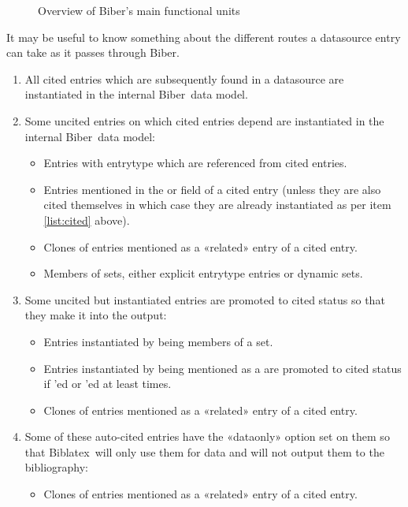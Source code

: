 \documentclass{ltxdockit}
\newcommand*{\biber}{Biber\xspace}
\newcommand*{\biblatex}{Biblatex\xspace}
\begin{document}
\begin{figure}[!htpb]
  \caption{Overview of \biber's main functional units}
  \label{fig:overview}
\end{figure}

It may be useful to know something about the different routes a datasource
entry can take as it passes through \biber.

\begin{enumerate}
\item\label{list:cited} All cited entries which are subsequently found in a
  datasource are instantiated in the internal \biber\ data model.
\item Some uncited entries on which cited entries depend are
  instantiated in the internal \biber\ data model:
  \begin{itemize}
  \item Entries with entrytype  which are referenced from cited
    entries.
  \item Entries mentioned in the  or
     field of a cited entry (unless they are also cited
    themselves in which case they are already instantiated as per item
    \ref{list:cited} above).
      \item Clones of entries mentioned as a «related» entry of a cited
        entry.
      \item Members of sets, either explicit  entrytype entries or
        dynamic sets.
  \end{itemize}
\item Some uncited but instantiated entries are promoted to cited
  status so that they make it into the output:
  \begin{itemize}
  \item Entries instantiated by being members of a set.
  \item Entries instantiated by being mentioned as a  are
    promoted to cited status if 'ed or 'ed at
    least  times.
  \item Clones of entries mentioned as a «related» entry of a cited entry.
  \end{itemize}
\item Some of these auto-cited entries have the «dataonly» option set on
  them so that \biblatex\ will only use them for data and will not output
  them to the bibliography:
  \begin{itemize}
  \item Clones of entries mentioned as a «related» entry of a cited entry.
  \end{itemize}
\end{enumerate}
\end{document}
